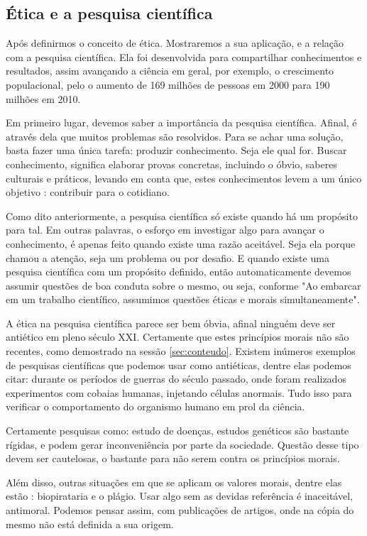 \documentclass[12pt]{article}
\begin{document}
\subsection{Ética e a pesquisa científica} \label{sec:sub1}

Após definirmos o conceito de ética. Mostraremos a sua aplicação, e a relação com a pesquisa científica. Ela foi desenvolvida para compartilhar 
conhecimentos e resultados, assim avançando a ciência 
em geral, por exemplo, o crescimento 
populacional, pelo o aumento de 169 milhões de pessoas 
em 2000\cite{censo:00} para 190 milhões em 2010\cite{censo:10}.

Em primeiro lugar, devemos saber a importância da pesquisa científica. Afinal, é através dela que muitos problemas são resolvidos. Para se achar uma solução, basta fazer uma única tarefa: produzir conhecimento. Seja ele qual for. Buscar conhecimento, significa elaborar provas concretas, incluindo o óbvio, saberes culturais e práticos, levando em conta que, estes conhecimentos levem a um único objetivo : contribuir para o cotidiano.

Como dito anteriormente, a pesquisa científica só existe quando há um propósito para tal. Em outras palavras, o esforço em investigar algo para avançar o conhecimento, é apenas feito quando existe uma razão aceitável. Seja ela porque chamou a atenção, seja um problema ou por desafio. E quando existe uma pesquisa científica com um propósito definido, então automaticamente devemos assumir questões de boa conduta sobre o mesmo, ou seja, conforme \cite{PETER} "Ao embarcar em um trabalho científico, assumimos questões éticas e morais simultaneamente".

A ética na pesquisa científica parece ser bem óbvia, afinal ninguém deve ser antiético em pleno século XXI. Certamente que estes princípios morais não são recentes, como demostrado na sessão \ref{sec:conteudo}. Existem inúmeros exemplos de pesquisas científicas que podemos usar como antiéticas, dentre elas podemos citar: durante os períodos de guerras do século passado, onde foram realizados experimentos com cobaias humanas, injetando células anormais. Tudo isso para verificar o comportamento do organismo humano em prol da ciência. 

Certamente pesquisas como: estudo de doenças, estudos genéticos são bastante rígidas, e podem gerar inconveniência por parte da sociedade. Questão desse tipo devem ser cautelosas, o bastante para não serem contra os princípios morais.

Além disso, outras situações em que se aplicam os valores morais, dentre elas estão : biopirataria e o plágio. Usar algo sem as devidas referência é inaceitável, antimoral. Podemos pensar assim, com publicações de artigos, onde na cópia do mesmo não está definida a sua origem.
\end{document}
